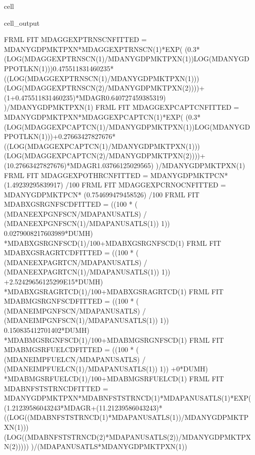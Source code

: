 \documentclass[letterpaper,10pt,english]{jupyterBook}
\begin{document}
\begin{sphinxuseclass}{cell}
\begin{sphinxVerbatimOutput}
\begin{sphinxuseclass}{cell_output}
\begin{sphinxVerbatim}[commandchars=\\\{\}]
FRML \PYGZlt{}FIT\PYGZgt{} MDAGGEXPTRNSCN\PYGZus{}FITTED = MDANYGDPMKTPXN*MDAGGEXPTRNSCN(\PYGZhy{}1)*EXP( (\PYGZhy{}0.3*(LOG(MDAGGEXPTRNSCN(\PYGZhy{}1)/MDANYGDPMKTPXN(\PYGZhy{}1))\PYGZhy{}LOG(MDANYGDPPOTLKN(\PYGZhy{}1)))\PYGZhy{}0.475511831460235*((LOG(MDAGGEXPTRNSCN(\PYGZhy{}1)/MDANYGDPMKTPXN(\PYGZhy{}1)))\PYGZhy{}(LOG(MDAGGEXPTRNSCN(\PYGZhy{}2)/MDANYGDPMKTPXN(\PYGZhy{}2))))+(1+0.475511831460235)*MDAGR\PYGZhy{}0.640727459385319) )/MDANYGDPMKTPXN(\PYGZhy{}1) \PYGZdl{}
FRML \PYGZlt{}FIT\PYGZgt{} MDAGGEXPCAPTCN\PYGZus{}FITTED = MDANYGDPMKTPXN*MDAGGEXPCAPTCN(\PYGZhy{}1)*EXP( (\PYGZhy{}0.3*(LOG(MDAGGEXPCAPTCN(\PYGZhy{}1)/MDANYGDPMKTPXN(\PYGZhy{}1))\PYGZhy{}LOG(MDANYGDPPOTLKN(\PYGZhy{}1)))+0.27663427827676*((LOG(MDAGGEXPCAPTCN(\PYGZhy{}1)/MDANYGDPMKTPXN(\PYGZhy{}1)))\PYGZhy{}(LOG(MDAGGEXPCAPTCN(\PYGZhy{}2)/MDANYGDPMKTPXN(\PYGZhy{}2))))+(1\PYGZhy{}0.27663427827676)*MDAGR\PYGZhy{}1.03766125029565) )/MDANYGDPMKTPXN(\PYGZhy{}1) \PYGZdl{}
FRML \PYGZlt{}FIT\PYGZgt{} MDAGGEXPOTHRCN\PYGZus{}FITTED = MDANYGDPMKTPCN* (1.49239295839917) /100 \PYGZdl{}
FRML \PYGZlt{}FIT\PYGZgt{} MDAGGEXPCRNOCN\PYGZus{}FITTED = MDANYGDPMKTPCN* (0.754699479458526) /100 \PYGZdl{}
FRML \PYGZlt{}FIT\PYGZgt{} MDABXGSRGNFSCD\PYGZus{}FITTED =  ((100 * ( (MDANEEXPGNFSCN/MDAPANUSATLS) / (MDANEEXPGNFSCN(\PYGZhy{}1)/MDAPANUSATLS(\PYGZhy{}1)) \PYGZhy{}1)) \PYGZhy{}0.0279008217603989*DUMH) *MDABXGSRGNFSCD(\PYGZhy{}1)/100+MDABXGSRGNFSCD(\PYGZhy{}1) \PYGZdl{}
FRML \PYGZlt{}FIT\PYGZgt{} MDABXGSRAGRTCD\PYGZus{}FITTED =  ((100 * ( (MDANEEXPAGRTCN/MDAPANUSATLS) / (MDANEEXPAGRTCN(\PYGZhy{}1)/MDAPANUSATLS(\PYGZhy{}1)) \PYGZhy{}1)) +2.52429656125299E\PYGZhy{}15*DUMH) *MDABXGSRAGRTCD(\PYGZhy{}1)/100+MDABXGSRAGRTCD(\PYGZhy{}1) \PYGZdl{}
FRML \PYGZlt{}FIT\PYGZgt{} MDABMGSRGNFSCD\PYGZus{}FITTED =  ((100 * ( (MDANEIMPGNFSCN/MDAPANUSATLS) / (MDANEIMPGNFSCN(\PYGZhy{}1)/MDAPANUSATLS(\PYGZhy{}1)) \PYGZhy{}1)) \PYGZhy{}0.150835412701402*DUMH) *MDABMGSRGNFSCD(\PYGZhy{}1)/100+MDABMGSRGNFSCD(\PYGZhy{}1) \PYGZdl{}
FRML \PYGZlt{}FIT\PYGZgt{} MDABMGSRFUELCD\PYGZus{}FITTED =  ((100 * ( (MDANEIMPFUELCN/MDAPANUSATLS) / (MDANEIMPFUELCN(\PYGZhy{}1)/MDAPANUSATLS(\PYGZhy{}1)) \PYGZhy{}1)) +0*DUMH) *MDABMGSRFUELCD(\PYGZhy{}1)/100+MDABMGSRFUELCD(\PYGZhy{}1) \PYGZdl{}
FRML \PYGZlt{}FIT\PYGZgt{} MDABNFSTSTRNCD\PYGZus{}FITTED = MDANYGDPMKTPXN*MDABNFSTSTRNCD(\PYGZhy{}1)*MDAPANUSATLS(\PYGZhy{}1)*EXP( (1.21239586043243*MDAGR+(1\PYGZhy{}1.21239586043243)*((LOG((MDABNFSTSTRNCD(\PYGZhy{}1)*MDAPANUSATLS(\PYGZhy{}1))/MDANYGDPMKTPXN(\PYGZhy{}1)))\PYGZhy{}(LOG((MDABNFSTSTRNCD(\PYGZhy{}2)*MDAPANUSATLS(\PYGZhy{}2))/MDANYGDPMKTPXN(\PYGZhy{}2))))) )/(MDAPANUSATLS*MDANYGDPMKTPXN(\PYGZhy{}1)) \PYGZdl{}

\end{sphinxVerbatim}
\end{sphinxuseclass}
\end{sphinxVerbatimOutput}
\end{sphinxuseclass}
\end{document}
